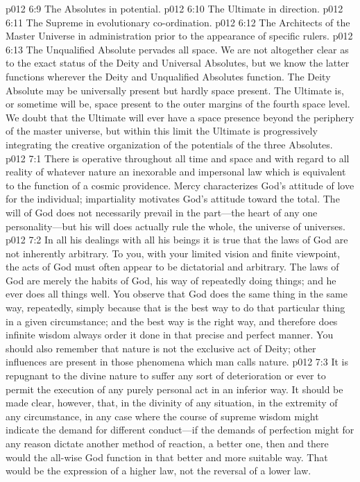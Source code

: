 \pc \vs p012 6:9 \bibnobreakspace The Absolutes in potential.
\vs p012 6:10 \bibnobreakspace The Ultimate in direction.
\vs p012 6:11 \bibnobreakspace The Supreme in evolutionary co\hyp{}ordination.
\vs p012 6:12 \bibnobreakspace The Architects of the Master Universe in administration prior to the appearance of specific rulers.
\pc \vs p012 6:13 The Unqualified Absolute pervades all space. We are not altogether clear as to the exact status of the Deity and Universal Absolutes, but we know the latter functions wherever the Deity and Unqualified Absolutes function. The Deity Absolute may be universally present but hardly space present. The Ultimate is, or sometime will be, space present to the outer margins of the fourth space level. We doubt that the Ultimate will ever have a space presence beyond the periphery of the master universe, but within this limit the Ultimate is progressively integrating the creative organization of the potentials of the three Absolutes.
\vs p012 7:1 There is operative throughout all time and space and with regard to all reality of whatever nature an inexorable and impersonal law which is equivalent to the function of a cosmic providence. Mercy characterizes God’s attitude of love for the individual; impartiality motivates God’s attitude toward the total. The will of God does not necessarily prevail in the part---the heart of any one personality---but his will does actually rule the whole, the universe of universes.
\pc \vs p012 7:2 In all his dealings with all his beings it is true that the laws of God are not inherently arbitrary. To you, with your limited vision and finite viewpoint, the acts of God must often appear to be dictatorial and arbitrary. The laws of God are merely the habits of God, his way of repeatedly doing things; and he ever does all things well. You observe that God does the same thing in the same way, repeatedly, simply because that is the best way to do that particular thing in a given circumstance; and the best way is the right way, and therefore does infinite wisdom always order it done in that precise and perfect manner. You should also remember that nature is not the exclusive act of Deity; other influences are present in those phenomena which man calls nature.
\vs p012 7:3 It is repugnant to the divine nature to suffer any sort of deterioration or ever to permit the execution of any purely personal act in an inferior way. It should be made clear, however, that,  in the divinity of any situation, in the extremity of any circumstance, in any case where the course of supreme wisdom might indicate the demand for different conduct---if the demands of perfection might for any reason dictate another method of reaction, a better one, then and there would the all\hyp{}wise God function in that better and more suitable way. That would be the expression of a higher law, not the reversal of a lower law.
